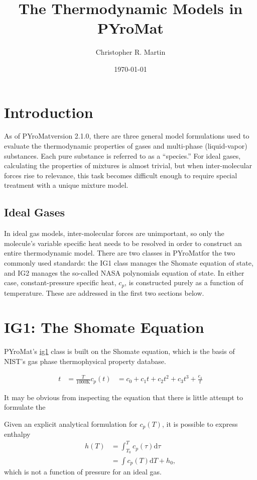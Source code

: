 \documentclass[twocolumn,letterpaper,11pt]{article}
\title{The Thermodynamic Models in PYroMat}
\author{Christopher R. Martin}
\date{\today}
\def\pm{PYroMat}
\def\d{\mathrm{d}}
\begin{document}
\maketitle

\section{Introduction}

As of \pm version 2.1.0, there are three general model formulations used to evaluate the thermodynamic properties of gases and multi-phase (liquid-vapor) substances.  Each pure substance is referred to as a ``species.''  For ideal gases, calculating the properties of mixtures is almost trivial, but when inter-molecular forces rise to relevance, this task becomes difficult enough to require special treatment with a unique mixture model.

\subsection{Ideal Gases}
In ideal gas models, inter-molecular forces are unimportant, so only the molecule's variable specific heat needs to be resolved in order to construct an entire thermodynamic model.  There are two classes in \pm for the two commonly used standards: the IG1 class manages the Shomate equation of state, and IG2 manages the so-called NASA polynomials equation of state.  In either case, constant-pressure specific heat, $c_p$, is constructed purely as a function of temperature.  These are addressed in the first two sections below.


\section{IG1: The Shomate Equation}

\pm's \underline{ig1} class is built on the Shomate equation, which is the basis of NIST's gas phase thermophysical property database.  

\begin{align}
t &= \frac{T}{1000 \mathrm{K}}
c_p(t) &= c_0 + c_1 t + c_2 t^2 + c_3 t^3 + \frac{c_4}{t}
\end{align}

It may be obvious from inspecting the equation that there is little attempt to formulate the 


Given an explicit analytical formulation for $c_p(T)$, it is possible to express enthalpy
\begin{align}
h(T) &= \int_{T_0}^T c_p(\tau) \d \tau \nonumber\\
 &= \int c_p(T) \d T + h_0,
\end{align}
which is not a function of pressure for an ideal gas.
\end{document}
